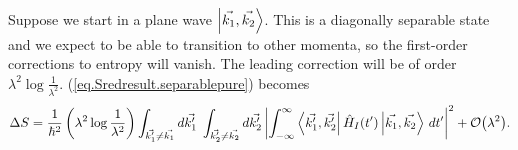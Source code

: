 Suppose we start in a plane wave \(\left|\vec{k_1}, \vec{k_2}\right\rangle\). This is a diagonally separable state and we expect to be able to transition to other momenta, so the first-order corrections to entropy will vanish. The leading correction will be of order \(\lambda^2 \log \frac{1}{\lambda^2}
\). (\ref{eq.Sredresult.separablepure}) becomes
\begin{equation}\label{eq.ex-scattering.corstart}
\Delta S =\frac{1}{\hbar^2}\left(\lambda^2 \log\frac{1}{\lambda^2}\right) \int_{\vec{k_1^\prime}\neq \vec{k_1}} d\vec{k_1^\prime} \;\int_{\vec{k_2^\prime}\neq \vec{k_2}} d\vec{k_2^\prime} \left|\int_{-\infty}^\infty \left\langle\vec{k_1^\prime}, \vec{k_2^\prime}\right| \hat{H}_I (t^{\prime})\left|\vec{k_1}, \vec{k_2}\right\rangle \,dt^{\prime}\right|^2 + \mathcal{O}{\left(\lambda^2\right)}.
\end{equation}

